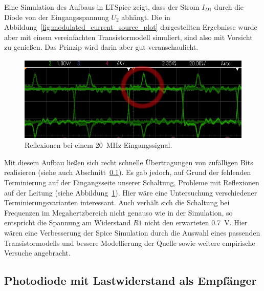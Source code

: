 \documentclass[12pt,a4paper]{article}
\begin{document}
Eine Simulation des Aufbaus in LTSpice zeigt, dass der Strom $I_{D1}$ durch die Diode von der Eingangsspannung $U_2$ abhängt. Die in Abbildung~\ref{fig:modulated_current_source_plot} dargestellten Ergebnisse wurde aber mit einem vereinfachten Transistormodell simuliert, sind also mit Vorsicht zu genießen. Das Prinzip wird darin aber gut veranschaulicht.

\begin{figure}[H]
  \centering
    \includegraphics[width=1.0\textwidth]{img/ring_20MHz.png}
  \caption{Reflexionen bei einem \SI{20}{\mega\hertz} Eingangssignal.}
  \label{fig:ring_20mhz}
\end{figure}

Mit diesem Aufbau ließen sich recht schnelle Übertragungen von zufälligen Bits realisieren (siehe auch Abschnitt~\ref{sec:direct_rx}). Es gab jedoch, auf Grund der fehlenden Terminierung auf der Eingangsseite unserer Schaltung, Probleme mit Reflexionen auf der Leitung (siehe Abbildung~\ref{fig:ring_20mhz}). Hier wäre eine Untersuchung verschiedener Terminierungsvarianten interessant. Auch verhält sich die Schaltung bei Frequenzen im Megahertzbereich nicht genauso wie in der Simulation, so entspricht die Spannung am Widerstand $R1$ nicht den erwarteten \SI{0.7}{\volt}. Hier wären eine Verbesserung der Spice Simulation durch die Auswahl eines passenden Transistormodells und bessere Modellierung der Quelle sowie weitere empirische Versuche angebracht.

\subsection{Photodiode mit Lastwiderstand als Empfänger}
\label{sec:direct_rx}
\end{document}
